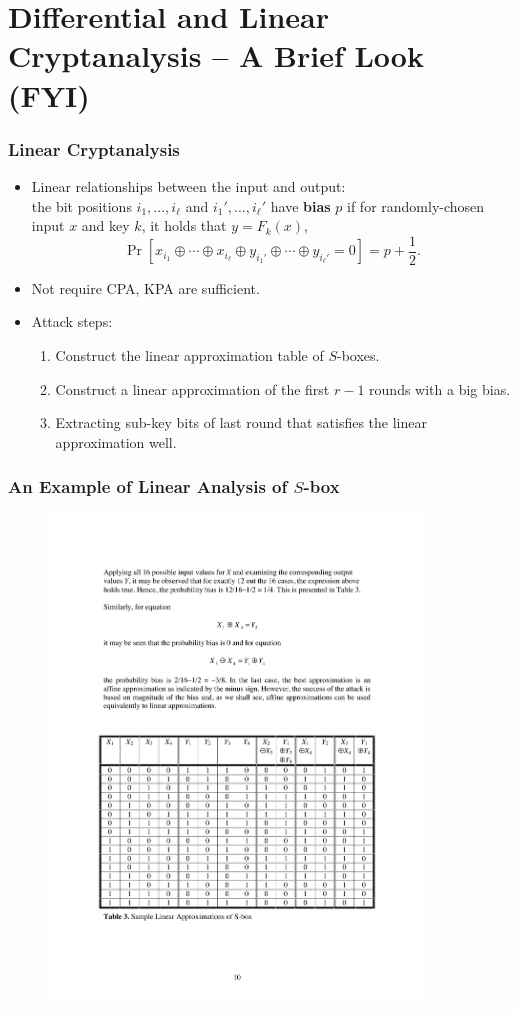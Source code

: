 \section{Differential and Linear Cryptanalysis -- A Brief Look (FYI)}
\begin{frame}\frametitle{Linear Cryptanalysis}
\begin{itemize}
\item Linear relationships between the input and output: \\
the bit positions $i_1, ... ,i_\ell$ and $i_1', ... , i_\ell'$ have \textbf{bias} $p$ if for randomly-chosen input $x$ and key $k$, it holds that $y=F_k(x)$,
\[ \Pr [x_{i_1} \oplus \cdots \oplus x_{i_\ell} \oplus y_{i_1'} \oplus \cdots \oplus y_{i_\ell'} = 0] = p+\frac{1}{2}.
\]
\item Not require CPA, KPA are sufficient.
\item Attack steps:
\begin{enumerate}
\item Construct the linear approximation table of $S$-boxes.
\item Construct a linear approximation of the first $r-1$ rounds with a big bias.
\item Extracting sub-key bits of last round that satisfies the linear approximation well.
\end{enumerate}
\end{itemize}
\end{frame}
\begin{frame}\frametitle{An Example of Linear Analysis of $S$-box}
\begin{figure}
\begin{center}
\includegraphics[width=100mm]{pic/linear-sbox} 
\end{center}
\end{figure}
\end{frame}
